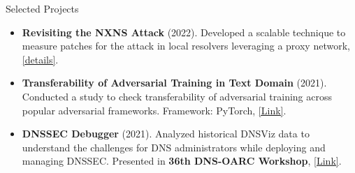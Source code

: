 \documentclass[]{mcdowellcv}
\begin{document}
	\begin{cvsection}{Selected Projects}
		\begin{cvsubsection}{}{}{}
			\begin{itemize}
				\item \textbf{Revisiting the NXNS Attack} (2022). Developed a scalable technique to measure patches for the attack in local resolvers leveraging a proxy network, \href{https://drive.google.com/file/d/1kuTSIHuNUYxmIKbR6MsSg3znMqx55mCP/view}{[details]}.
				\item \textbf{Transferability of Adversarial Training in Text Domain} (2021). Conducted a study to check transferability of adversarial training across popular adversarial frameworks. Framework: PyTorch, \href{https://github.com/Ashiq5/AdvTrainingExperiment}{[Link]}.
				\item \textbf{DNSSEC Debugger} (2021). Analyzed historical DNSViz data to understand the challenges for DNS administrators while deploying and managing DNSSEC. Presented in \textbf{36th DNS-OARC Workshop}, \href{https://indico.dns-oarc.net/event/40/contributions/891/attachments/857/1555/DNS-OARC-final.pdf}{[Link]}.
			\end{itemize}
		\end{cvsubsection}
	\end{cvsection}
\end{document}
